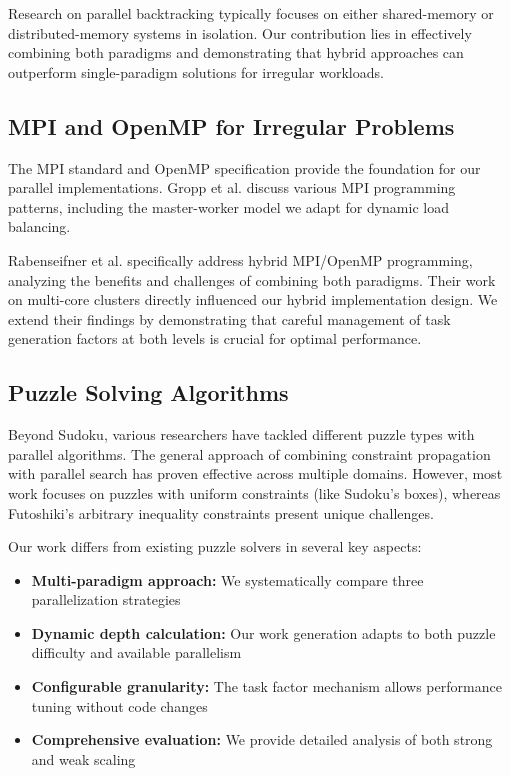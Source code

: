 Research on parallel backtracking typically focuses on either shared-memory or distributed-memory systems in isolation. Our contribution lies in effectively combining both paradigms and demonstrating that hybrid approaches can outperform single-paradigm solutions for irregular workloads.

\subsection{MPI and OpenMP for Irregular Problems}
The MPI standard \cite{MPIForum2021} and OpenMP specification \cite{OpenMP2020} provide the foundation for our parallel implementations. Gropp et al. \cite{Gropp1999} discuss various MPI programming patterns, including the master-worker model we adapt for dynamic load balancing.

Rabenseifner et al. \cite{Rabenseifner2009} specifically address hybrid MPI/OpenMP programming, analyzing the benefits and challenges of combining both paradigms. Their work on multi-core clusters directly influenced our hybrid implementation design. We extend their findings by demonstrating that careful management of task generation factors at both levels is crucial for optimal performance.

\subsection{Puzzle Solving Algorithms}
Beyond Sudoku, various researchers have tackled different puzzle types with parallel algorithms. The general approach of combining constraint propagation with parallel search has proven effective across multiple domains. However, most work focuses on puzzles with uniform constraints (like Sudoku's boxes), whereas Futoshiki's arbitrary inequality constraints present unique challenges.

Our work differs from existing puzzle solvers in several key aspects:
\begin{itemize}
    \item \textbf{Multi-paradigm approach:} We systematically compare three parallelization strategies
    \item \textbf{Dynamic depth calculation:} Our work generation adapts to both puzzle difficulty and available parallelism
    \item \textbf{Configurable granularity:} The task factor mechanism allows performance tuning without code changes
    \item \textbf{Comprehensive evaluation:} We provide detailed analysis of both strong and weak scaling
\end{itemize}

